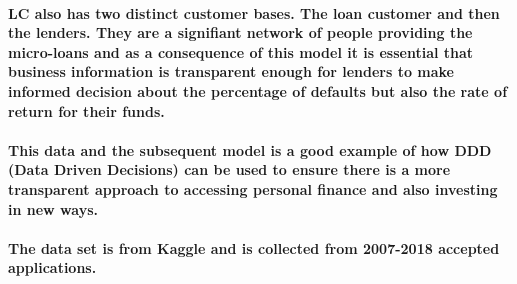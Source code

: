 \documentclass[
]{article}
\begin{document}
\hypertarget{lc-also-has-two-distinct-customer-bases.-the-loan-customer-and-then-the-lenders.-they-are-a-signifiant-network-of-people-providing-the-micro-loans-and-as-a-consequence-of-this-model-it-is-essential-that-business-information-is-transparent-enough-for-lenders-to-make-informed-decision-about-the-percentage-of-defaults-but-also-the-rate-of-return-for-their-funds.}{%
\paragraph{LC also has two distinct customer bases. The loan customer
and then the lenders. They are a signifiant network of people providing
the micro-loans and as a consequence of this model it is essential that
business information is transparent enough for lenders to make informed
decision about the percentage of defaults but also the rate of return
for their
funds.}\label{lc-also-has-two-distinct-customer-bases.-the-loan-customer-and-then-the-lenders.-they-are-a-signifiant-network-of-people-providing-the-micro-loans-and-as-a-consequence-of-this-model-it-is-essential-that-business-information-is-transparent-enough-for-lenders-to-make-informed-decision-about-the-percentage-of-defaults-but-also-the-rate-of-return-for-their-funds.}}

\hypertarget{this-data-and-the-subsequent-model-is-a-good-example-of-how-ddd-data-driven-decisions-can-be-used-to-ensure-there-is-a-more-transparent-approach-to-accessing-personal-finance-and-also-investing-in-new-ways.}{%
\paragraph{This data and the subsequent model is a good example of how
DDD (Data Driven Decisions) can be used to ensure there is a more
transparent approach to accessing personal finance and also investing in
new
ways.}\label{this-data-and-the-subsequent-model-is-a-good-example-of-how-ddd-data-driven-decisions-can-be-used-to-ensure-there-is-a-more-transparent-approach-to-accessing-personal-finance-and-also-investing-in-new-ways.}}

\hypertarget{the-data-set-is-from-kaggle-and-is-collected-from-2007-2018-accepted-applications.}{%
\paragraph{The data set is from Kaggle and is collected from 2007-2018
accepted
applications.}\label{the-data-set-is-from-kaggle-and-is-collected-from-2007-2018-accepted-applications.}}
\end{document}

